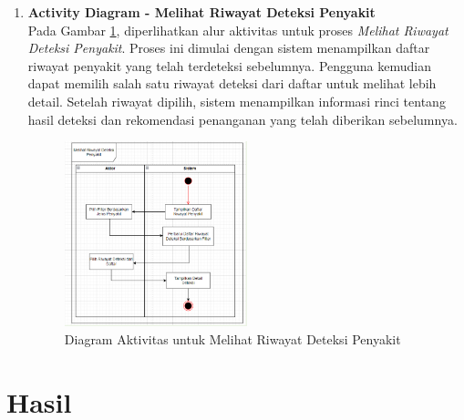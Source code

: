 \documentclass[journal,article,submit,pdftex,moreauthors]{Definitions/mdpi}
\begin{document}
\begin{enumerate}[label=\alph*)]
    \item \textbf{Activity Diagram - Melihat Riwayat Deteksi Penyakit} \\
    Pada Gambar \ref{fig:activity-view-history1}, diperlihatkan alur aktivitas untuk proses \textit{Melihat Riwayat Deteksi Penyakit}. Proses ini dimulai dengan sistem menampilkan daftar riwayat penyakit yang telah terdeteksi sebelumnya. Pengguna kemudian dapat memilih salah satu riwayat deteksi dari daftar untuk melihat lebih detail. Setelah riwayat dipilih, sistem menampilkan informasi rinci tentang hasil deteksi dan rekomendasi penanganan yang telah diberikan sebelumnya.
    
    \begin{figure}[H]
        \centering
        \includegraphics[width=0.5\textwidth]{Images/activity_history.png}
        \caption{\centering Diagram Aktivitas untuk Melihat Riwayat Deteksi Penyakit}
        \label{fig:activity-view-history1}
    \end{figure}
\end{enumerate}

\section{Hasil}
\end{document}
